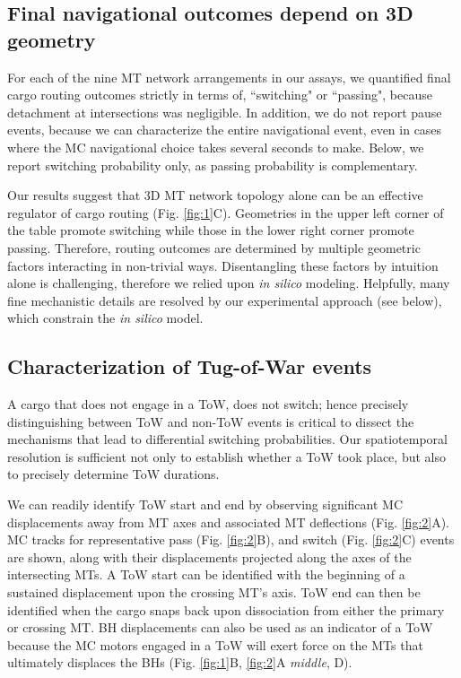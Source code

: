 \subsection{Final navigational outcomes depend on 3D geometry}

For each of the nine MT network arrangements in our assays, we quantified final cargo routing outcomes strictly in terms of, ``switching" or ``passing", because detachment at intersections was negligible. In addition, we do not report pause events, because we can characterize the entire navigational event, even in cases where the MC navigational choice takes several seconds to make. Below, we report switching probability only, as passing probability is complementary.

Our results suggest that 3D MT network topology alone can be an effective regulator of cargo routing (Fig. \ref{fig:1}C). Geometries in the upper left corner of the table promote switching while those in the lower right corner promote passing. Therefore, routing outcomes are determined by multiple geometric factors interacting in non-trivial ways. Disentangling these factors by intuition alone is challenging, therefore we relied upon \textit{in silico} modeling. Helpfully, many fine mechanistic details are resolved by our experimental approach (see below), which constrain the \textit{in silico} model.

\subsection{Characterization of Tug-of-War events}

A cargo that does not engage in a ToW, does not switch; hence precisely distinguishing between ToW and non-ToW events is critical to dissect the mechanisms that lead to differential switching probabilities. Our spatiotemporal resolution is sufficient not only to establish whether a ToW took place, but also to precisely determine ToW durations.

We can readily identify ToW start and end by observing significant MC displacements away from MT axes and associated MT deflections (Fig. \ref{fig:2}A). MC tracks for representative pass (Fig. \ref{fig:2}B), and switch (Fig. \ref{fig:2}C) events are shown, along with their displacements projected along the axes of the intersecting MTs. A ToW start can be identified with the beginning of a sustained displacement upon the crossing MT's axis. ToW end can then be identified when the cargo snaps back upon dissociation from either the primary or crossing MT. BH displacements can also be used as an indicator of a ToW because the MC motors engaged in a ToW will exert force on the MTs that ultimately displaces the BHs (Fig. \ref{fig:1}B, \ref{fig:2}A \textit{middle}, D).


